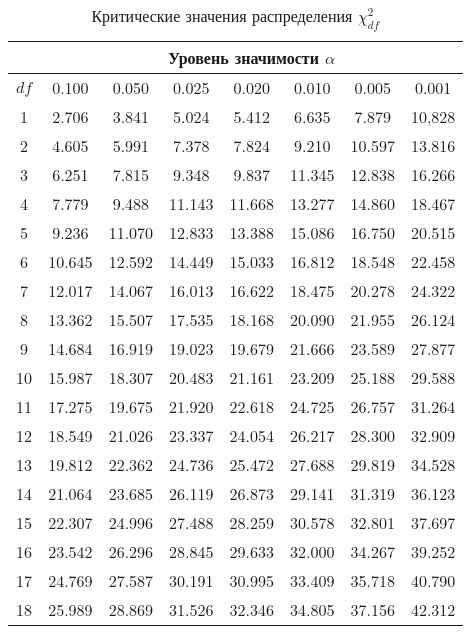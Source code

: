 \documentclass[12pt]{article}
\begin{document}
\begin{table}
\caption{Критические значения распределения $\chi^2_{df}$} %
\begin{center}
{\small
\begin{tabular}{|c|c|c|c|c|c|c|c|}
  \hline
   & \multicolumn{7}{c|}{Уровень значимости $\alpha$} \\ \hline
 $df$   & 0.100 &  0.050 &  0.025 &  0.020 &  0.010 &   0.005 &  0.001 \\ \hline \hline
1  & 2.706 &  3.841 &  5.024 &  5.412 &  6.635 &  7.879 &  10,828 \\
2  & 4.605 &  5.991 &  7.378 &  7.824 &  9.210 &  10.597 & 13.816 \\
3 &  6.251 &   7.815 &  9.348 &  9.837 &  11.345 & 12.838 & 16.266 \\
4 &  7.779 &  9.488 &  11.143 & 11.668 & 13.277 & 14.860 & 18.467 \\
5 &  9.236 &  11.070 & 12.833 & 13.388 & 15.086 & 16.750 & 20.515 \\
6 &  10.645 & 12.592 & 14.449 & 15.033 & 16.812 & 18.548 & 22.458 \\
7 &  12.017 & 14.067 & 16.013 & 16.622 & 18.475 & 20.278 & 24.322 \\
8 &  13.362 & 15.507 & 17.535 & 18.168 & 20.090 & 21.955 & 26.124 \\
9 &  14.684 & 16.919 & 19.023 & 19.679 & 21.666 & 23.589 & 27.877 \\
10 & 15.987 & 18.307 & 20.483 & 21.161 & 23.209 & 25.188 & 29.588 \\
11 &  17.275 &  19.675 & 21.920 & 22.618 & 24.725 & 26.757 & 31.264\\
12 & 18.549 & 21.026 & 23.337 & 24.054 & 26.217 & 28.300 & 32.909 \\
13 & 19.812 & 22.362 & 24.736 & 25.472 & 27.688 & 29.819 & 34.528 \\
14 & 21.064 & 23.685 & 26.119 & 26.873 & 29.141 & 31.319 & 36.123 \\
15 & 22.307 & 24.996 & 27.488 & 28.259 & 30.578 & 32.801 & 37.697 \\
16 &  23.542 & 26.296 & 28.845 & 29.633 & 32.000 & 34.267 & 39.252\\
17 & 24.769 & 27.587 & 30.191 & 30.995 & 33.409 & 35.718 & 40.790\\
18 & 25.989 & 28.869 & 31.526 & 32.346 & 34.805 & 37.156 & 42.312\\

\end{tabular}}
\end{center}
\end{table}
\end{document}
